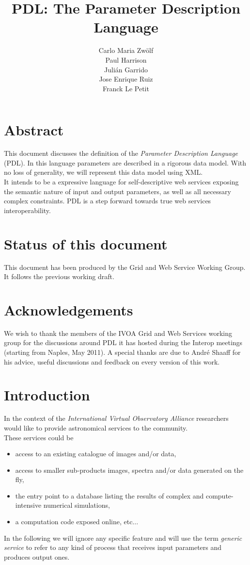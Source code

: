 \documentclass[a4paper,11pt] {ivoa}
\title{PDL: The Parameter Description Language}
\author{Carlo Maria Zw\"olf \\ Paul Harrison \\ Juli\'an Garrido \\ Jose Enrique Ruiz \\ Franck Le Petit}
\date{\pdldate}
\begin{document}
\maketitle
\section*{Abstract}
This document discusses the definition of the  {\it Parameter Description Language} (PDL). In this language parameters are described in a rigorous data model. With no loss of generality, we will represent this data model using XML.\\
It intends to be a expressive language for self-descriptive web services exposing the semantic nature of input and output parameters, as well as all necessary complex constraints. PDL is a step forward towards true web services interoperability. 
\section{Status of this document}
This document has been produced by the Grid and Web Service Working Group. It follows the previous working draft.
 
\section*{Acknowledgements}
We wish to thank the members of the IVOA Grid and Web Services working group for the discussions around PDL it has hosted during the Interop meetings (starting from Naples, May 2011). A special thanks are due to Andr\'e Shaaff for his advice, useful discussions and feedback on every version of this work.

\clearpage

\tableofcontents

\newpage

\section{Introduction}

In the context of the {\it International Virtual Observatory Alliance} researchers would like to
provide astronomical services to the community. \\
These services could be
\begin{itemize}
\item   access to an existing catalogue of images and/or data,
\item  access to smaller sub-products images, spectra and/or data generated on the fly,
\item  the entry point to a database listing the results of complex and compute-intensive numerical simulations,
\item a computation code exposed online, etc... 
\end{itemize}
In the following we will ignore any specific feature and will use the term {\it generic service} to
refer to any kind of process that receives input parameters and produces output ones.\\
\end{document}

